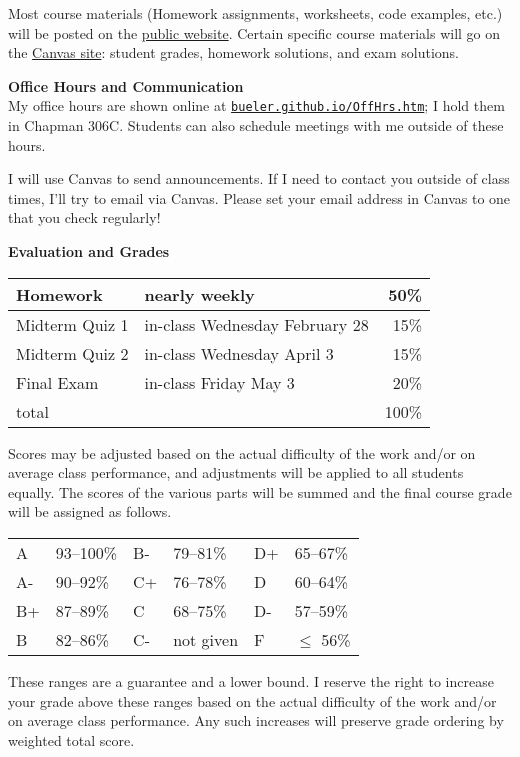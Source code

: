 \documentclass[12pt]{article}
\renewcommand{\emph}[1]{\textsf{\textbf{#1}}}
\newcommand{\localhead}[1]{\par\smallskip\textbf{#1} \smallskip\nobreak\\}%
\def\heading#1{\localhead{\large\emph{#1}}}
\begin{document}
Most course materials (Homework assignments, worksheets, code examples, etc.) will be posted on the \href{https://bueler.github.io/fa/}{public website}.  Certain specific course materials will go on the \href{https://canvas.alaska.edu/courses/18441}{Canvas site}: student grades, homework solutions, and exam solutions.


\clearpage\newpage
\phantom{foo}
\heading{Office Hours and Communication}
My office hours are shown online at \href{http://bueler.github.io/OffHrs.htm}{\texttt{bueler.github.io/OffHrs.htm}}; I hold them in Chapman 306C.  Students can also schedule meetings with me outside of these hours.

I will use Canvas to send announcements.  If I need to contact you outside of class times, I'll try to email via Canvas.  Please set your email address in Canvas to one that you check regularly!


\heading{Evaluation and Grades}
\vskip -10pt

\begin{tabular}{|l|l|r|}
\hline
Homework & nearly weekly & 50\% \\
\hline
Midterm Quiz 1 & in-class Wednesday February 28 & 15\%  \\
\hline
Midterm Quiz 2 & in-class Wednesday April 3 & 15\%  \\
\hline
Final Exam     & in-class Friday May 3 & 20\% \\
\hline
total & & 100\% \\
\hline
\end{tabular}

Scores may be adjusted based on the actual difficulty of the work and/or on average class performance, and adjustments will be applied to all students equally.  The scores of the various parts will be summed and the final course grade will be assigned as follows.

\begin{tabular}{llllll}
A  & 93--100\% & B- & 79--81\%  & D+ & 65--67\%  \\
A- & 90--92\%  & C+ & 76--78\%  & D  & 60--64\%  \\
B+ & 87--89\%  & C  & 68--75\%  & D- & 57--59\%  \\
B  & 82--86\%  & C- & not given & F  & $\le$ 56\%
\end{tabular}

These ranges are a guarantee and a lower bound.  I reserve the right to increase your grade above these ranges based on the actual difficulty of the work and/or on average class performance.  Any such increases will preserve grade ordering by weighted total score.
\end{document}
